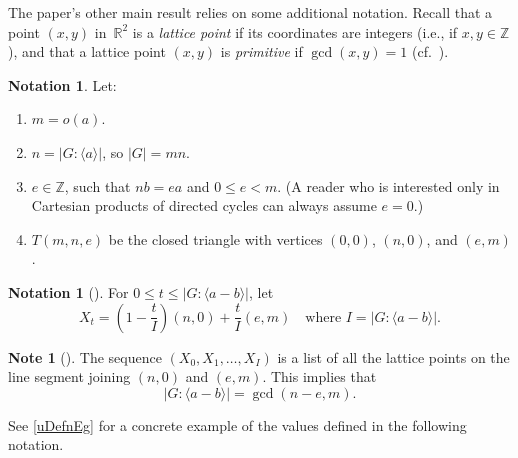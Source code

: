 \documentclass[11pt]{amsart}
\makeatletter
\theoremstyle{definition}
\newtheorem{notation}[equation]{Notation}
\newtheorem{Note}[equation]{Note}
\numberwithin{case}{startcases}
\newcommand{\noprelistbreak}{\@nobreaktrue\nopagebreak\vskip4pt} %
\numberwithin{equation}{section}
\newcommand{\R}{\mathbb{R}}  %
\newcommand{\Z}{\mathbb{Z}}  %
\makeatother
\begin{document}
	The paper's other main result relies on some additional notation. 
	Recall that a point $(x,y)$ in~$\R^2$ is a \emph{lattice point} if its coordinates are integers (i.e., if $x,y \in \Z$), and that a lattice point $(x,y)$ is \emph{primitive} if $\gcd(x,y) = 1$ (cf.~\cite[Prop.~7.2, p.~36]{Clark}).
	
	\begin{notation} \label{mneDefn}
		Let:
		\noprelistbreak
		\begin{enumerate}
			\item $m = o(a)$.
			\item $n = |G : \langle a \rangle|$, so $|G| = mn$.
			\item $e \in \Z$, such that $nb = ea$ and $0 \le e < m$. (A reader who is interested only in Cartesian products of directed cycles can always assume $e = 0$.)
			\item $T(m,n,e)$ be the closed triangle with vertices $(0,0)$, $(n,0)$, and $(e,m)$.
		\end{enumerate}
	\end{notation}
	
	\begin{notation}[{\cite[Notn.~3.4]{Curran}}] \label{XtDefn}
		For $0\leq t \leq |G : \langle a - b \rangle|$, let 
		\[ X_t = \left(1-\frac{t}{I}\right)(n,0) + \frac{t}{I}(e,m) 
		\quad \text{where $I = |G : \langle a - b \rangle|$}
		. \]
	\end{notation}
	
	\begin{Note}[{\cite[Rem.~3.6]{Curran}}] \label{XtIsLatt}
		The sequence $(X_0, X_1, \ldots, X_I)$ is a list of all the lattice points on the line segment joining $(n,0)$ and $(e,m)$. This implies that 
		\[ |G : \langle a - b \rangle| = \gcd(n-e, m) . \]
	\end{Note}
	
	See \cref{uDefnEg} for a concrete example of the values defined in the following notation.
	
\end{document}
